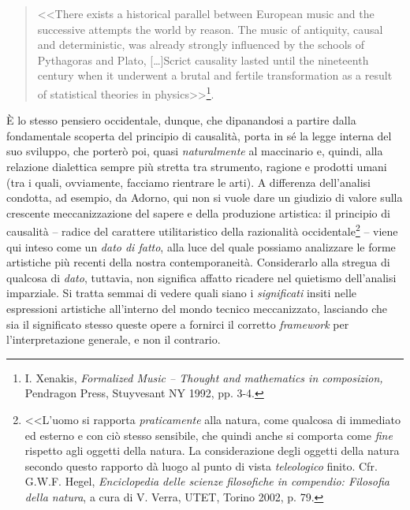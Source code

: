 \documentclass[a4paper,12pt]{scrartcl}
\newcommand{\omissis}{[\dots\unkern]}
\begin{document}
	\begin{quotation}
		\small{<<There exists a historical parallel between European music and the successive attempts the world by reason. The music of antiquity, causal and deterministic, was already strongly influenced by the schools of Pythagoras and Plato, \omissis Scrict causality lasted until the nineteenth century when it underwent a brutal and fertile transformation as a result of statistical theories in physics>>}\footnote{I. Xenakis, \textit{Formalized Music -- Thought and mathematics in composizion,} Pendragon Press, Stuyvesant NY 1992, pp. 3-4.}.
	\end{quotation}
	
	È lo stesso pensiero occidentale, dunque, che dipanandosi a partire dalla fondamentale scoperta del principio di causalità, porta in sé la legge interna del suo sviluppo, che porterò poi, quasi \emph{naturalmente} al maccinario e, quindi, alla relazione dialettica sempre più stretta tra strumento, ragione e prodotti umani (tra i quali, ovviamente, facciamo rientrare le arti). A differenza dell'analisi condotta, ad esempio, da Adorno, qui non si vuole dare un giudizio di valore sulla crescente meccanizzazione del sapere e della produzione artistica: il principio di causalità -- radice del carattere utilitaristico della razionalità occidentale\footnote{<<L'uomo si rapporta \emph{praticamente} alla natura, come qualcosa di immediato ed esterno e con ciò stesso sensibile, che quindi anche si comporta come \emph{fine} rispetto agli oggetti della natura. La considerazione degli oggetti della natura secondo questo rapporto dà luogo al punto di vista \emph{teleologico} finito. Cfr. G.W.F. Hegel, \textit{Enciclopedia delle scienze filosofiche in compendio: Filosofia della natura}, a cura di V. Verra, UTET, Torino 2002, p. 79.} -- viene qui inteso come un \emph{dato di fatto}, alla luce del quale possiamo analizzare le forme artistiche più recenti della nostra contemporaneità. Considerarlo alla stregua di qualcosa di \emph{dato}, tuttavia, non significa affatto ricadere nel quietismo dell'analisi imparziale. Si tratta semmai di vedere quali siano i \emph{significati} insiti nelle espressioni artistiche all'interno del mondo tecnico meccanizzato, lasciando che sia il significato stesso queste opere a fornirci il corretto \emph{framework} per l'interpretazione generale, e non il contrario.
	
\end{document}
